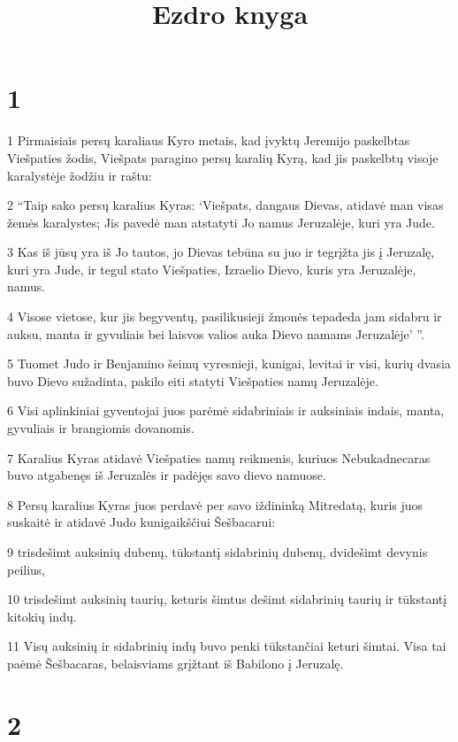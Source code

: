 

\title{Ezdro knyga}

\chapter{1}


\par 1 Pirmaisiais persų karaliaus Kyro metais, kad įvyktų Jeremijo paskelbtas Viešpaties žodis, Viešpats paragino persų karalių Kyrą, kad jis paskelbtų visoje karalystėje žodžiu ir raštu: 
\par 2 “Taip sako persų karalius Kyras: ‘Viešpats, dangaus Dievas, atidavė man visas žemės karalystes; Jis pavedė man atstatyti Jo namus Jeruzalėje, kuri yra Jude. 
\par 3 Kas iš jūsų yra iš Jo tautos, jo Dievas tebūna su juo ir tegrįžta jis į Jeruzalę, kuri yra Jude, ir tegul stato Viešpaties, Izraelio Dievo, kuris yra Jeruzalėje, namus. 
\par 4 Visose vietose, kur jis begyventų, pasilikusieji žmonės tepadeda jam sidabru ir auksu, manta ir gyvuliais bei laisvos valios auka Dievo namams Jeruzalėje’ ”. 
\par 5 Tuomet Judo ir Benjamino šeimų vyresnieji, kunigai, levitai ir visi, kurių dvasia buvo Dievo sužadinta, pakilo eiti statyti Viešpaties namų Jeruzalėje. 
\par 6 Visi aplinkiniai gyventojai juos parėmė sidabriniais ir auksiniais indais, manta, gyvuliais ir brangiomis dovanomis. 
\par 7 Karalius Kyras atidavė Viešpaties namų reikmenis, kuriuos Nebukadnecaras buvo atgabenęs iš Jeruzalės ir padėjęs savo dievo namuose. 
\par 8 Persų karalius Kyras juos perdavė per savo iždininką Mitredatą, kuris juos suskaitė ir atidavė Judo kunigaikščiui Šešbacarui: 
\par 9 trisdešimt auksinių dubenų, tūkstantį sidabrinių dubenų, dvidešimt devynis peilius, 
\par 10 trisdešimt auksinių taurių, keturis šimtus dešimt sidabrinių taurių ir tūkstantį kitokių indų. 
\par 11 Visų auksinių ir sidabrinių indų buvo penki tūkstančiai keturi šimtai. Visa tai paėmė Šešbacaras, belaisviams grįžtant iš Babilono į Jeruzalę.


\chapter{2}


